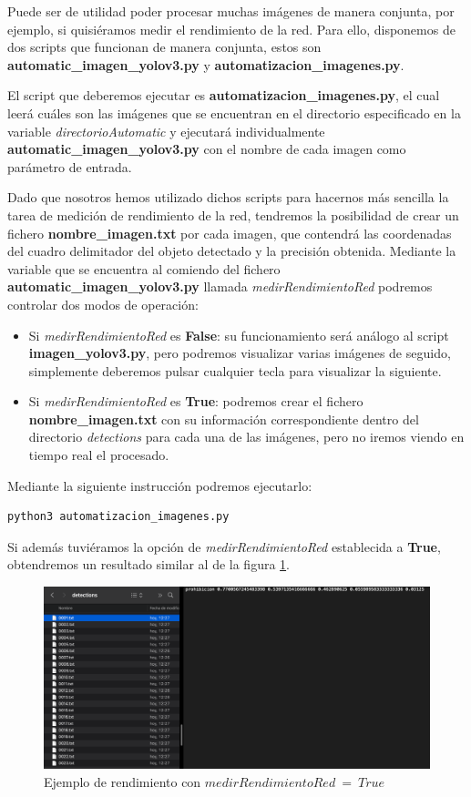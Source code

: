 Puede ser de utilidad poder procesar muchas imágenes de manera conjunta, por ejemplo, si quisiéramos medir el rendimiento de la red. Para ello, disponemos de dos scripts que funcionan de manera conjunta, estos son \textbf{automatic_imagen_yolov3.py} y \textbf{automatizacion_imagenes.py}. 

El script que deberemos ejecutar es \textbf{automatizacion_imagenes.py}, el cual leerá cuáles son las imágenes que se encuentran en el directorio especificado en la variable \textit{directorioAutomatic} y ejecutará individualmente \textbf{automatic_imagen_yolov3.py} con el nombre de cada imagen como parámetro de entrada.

Dado que nosotros hemos utilizado dichos scripts para hacernos más sencilla la tarea de medición de rendimiento de la red, tendremos la posibilidad de crear un fichero \textbf{nombre_imagen.txt} por cada imagen, que contendrá las coordenadas del cuadro delimitador del objeto detectado y la precisión obtenida. Mediante la variable que se encuentra al comiendo del fichero \textbf{automatic_imagen_yolov3.py} llamada \textit{medirRendimientoRed} podremos controlar dos modos de operación:

\begin{itemize}
\item Si \textit{medirRendimientoRed} es \textbf{False}: su funcionamiento será análogo al script \textbf{imagen_yolov3.py}, pero podremos visualizar varias imágenes de seguido, simplemente deberemos pulsar cualquier tecla para visualizar la siguiente. 

\item Si \textit{medirRendimientoRed} es \textbf{True}: podremos crear el fichero \textbf{nombre_imagen.txt} con su información correspondiente dentro del directorio \textit{detections} para cada una de las imágenes, pero no iremos viendo en tiempo real el procesado.
\end{itemize}

Mediante la siguiente instrucción podremos ejecutarlo:

\begin{lstlisting}
python3 automatizacion_imagenes.py
\end{lstlisting}

Si además tuviéramos la opción de \textit{medirRendimientoRed} establecida a \textbf{True}, obtendremos un resultado similar al de la figura \ref{detecc4}.

\begin{figure}[H]
	\centering
	\includegraphics[width=\textwidth]{Imagenes/AnexoI_Manual/AA/deteccion4.pdf}
	\caption{Ejemplo de rendimiento con $medirRendimientoRed \ =\ True$}
	\label{detecc4}
\end{figure}


